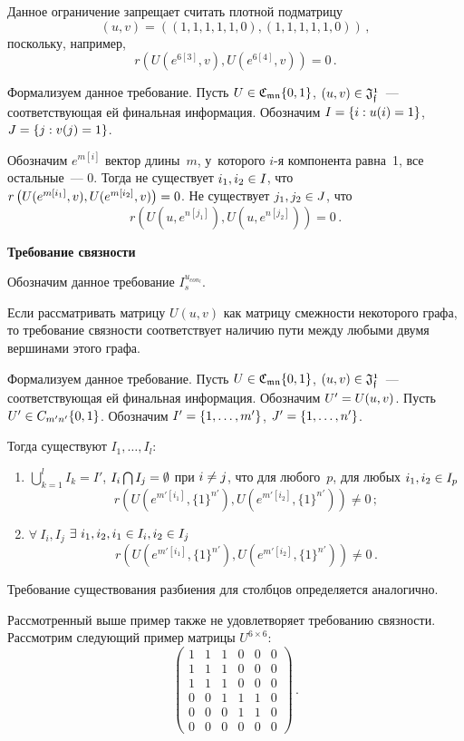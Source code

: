 \begin{multicols}{2}
\begin{description}
Данное ограничение запрещает считать плотной подматрицу
$$
(u,v)=((1,1,1,1,1,0), (1,1,1,1,1,0))\,,
$$
 поскольку, например,
$$
r\left(U\left(e^{6[3]}, v\right), U\left(e^{6[4]}, v\right)\right) = 0\,.
$$

Формализуем данное требование. Пусть $U \hm\in \mathfrak{C_{mn}}\{0,1\}$, $(u,v) 
\hm\in  \mathfrak{J_f^1}$~--- соответствующая ей финальная информация. 
Обозначим $I \hm= \{i:u(i)=1\}$, $J \hm= \{j:v(j)=1\}$.

Обозначим $e^{m[i]}$ вектор длины~$m$, у~которого $i$-я компонента равна~1, все 
остальные~--- 0. Тогда не существует $i_1, i_2\hm \in I$, что
 $r\left(U(e^{m[i_1]}, v), U(e^{m[i_2]}, v)\right) \hm= 0$. 
 Не существует $j_1, j_2 
\hm\in J$, что 
$$
r\left(U\left(u, e^{n[j_1]}\right), U\left(u, e^{n[j_2]}\right)\right) = 0\,.
$$

\item[\,] \textbf{Требование связности}

Обозначим данное требование $I_s^{u_{con_l}}$.

Если рассматривать матрицу $U(u,v)$ как матрицу смежности некоторого графа, то 
требование связности соответствует наличию пути между любыми двумя вершинами 
этого графа.

 Формализуем данное требование. Пусть $U\hm \in \mathfrak{C_{mn}}\{0,1\}$, $(u,v) 
\hm\in  \mathfrak{J_f^1}$~--- соответствующая ей финальная информация.
Обозначим $U' \hm= U(u,v)$. Пусть $U' \hm\in {C_{m'n'}}\{0,1\}$. Обозначим $I' \hm= 
\{1,\ldots,m'\}$, $J'\hm = \{1,\ldots,n'\}$.

Тогда существуют $I_1, \ldots,I_l:$
\begin{enumerate}[(1)]
\item $\bigcup\nolimits_{k=1}^l I_k = I'$, $I_i \bigcap I_j \hm= \emptyset$ 
при $i \hm\ne j$, что для 
любого~$p$, для любых $i_1, i_2 \hm\in I_p$
    $$
    r\left(U\left(e^{m'[i_1]}, \{1\}^{n'}\right), U\left(e^{m'[i_2]}, 
\{1\}^{n'}\right)\right) \ne 0\,;
$$


\item $\forall\ I_i, I_j$ $\exists\ i_1, i_2, i_1 \hm\in I_i, i_2 \hm\in I_j$ 
$$
r\left(U\left(e^{m'[i_1]}, \{1\}^{n'}\right), U\left(e^{m'[i_2]}, 
\{1\}^{n'}\right)\right) \ne 0\,.
$$
\end{enumerate}
Требование существования разбиения для столбцов определяется аналогично.

Рассмотренный выше пример также не удовле\-тво\-ря\-ет требованию связности. 
Рассмотрим сле\-ду\-ющий пример матрицы $U^{6\times 6}$:
$$
\begin{pmatrix} 
1 & 1 & 1 & 0 & 0 & 0 \\ 
1 & 1 & 1 & 0 & 0 & 0 \\ 
1 & 1 & 1 & 0 
& 0 & 0\\
 0 & 0 & 1 & 1 & 1 & 0 \\ 
 0 & 0 & 0 & 1 & 1 & 0 \\ 
 0 & 0 & 0 & 0 & 0 & 0 
 \end{pmatrix}\,.
 $$


\end{description}
\end{multicols}
